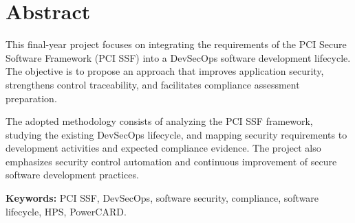 \chapter*{Abstract}

This final-year project focuses on integrating the requirements of the PCI Secure Software Framework (PCI SSF) into a DevSecOps software development lifecycle. The objective is to propose an approach that improves application security, strengthens control traceability, and facilitates compliance assessment preparation.

The adopted methodology consists of analyzing the PCI SSF framework, studying the existing DevSecOps lifecycle, and mapping security requirements to development activities and expected compliance evidence. The project also emphasizes security control automation and continuous improvement of secure software development practices.

\textbf{Keywords:} PCI SSF, DevSecOps, software security, compliance, software lifecycle, HPS, PowerCARD.

\clearpage
